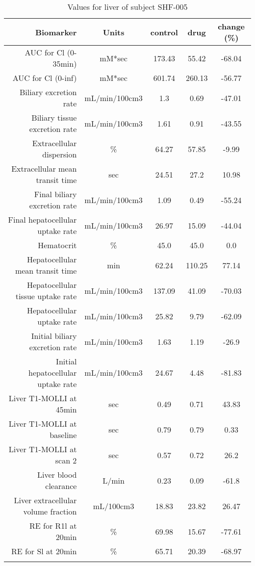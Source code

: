 \documentclass{epflreport}%
\begin{document}
%
\clearpage%
\begin{longtable}{rcccc}%
\hline%
Biomarker&Units&control&drug&change (\%)\\%
\hline%
AUC for Cl (0{-}35min)&mM*sec&173.43&55.42&{-}68.04\\%
AUC for Cl (0{-}inf)&mM*sec&601.74&260.13&{-}56.77\\%
Biliary excretion rate&mL/min/100cm3&1.3&0.69&{-}47.01\\%
Biliary tissue excretion rate&mL/min/100cm3&1.61&0.91&{-}43.55\\%
Extracellular dispersion&\%&64.27&57.85&{-}9.99\\%
Extracellular mean transit time&sec&24.51&27.2&10.98\\%
Final biliary excretion rate&mL/min/100cm3&1.09&0.49&{-}55.24\\%
Final hepatocellular uptake rate&mL/min/100cm3&26.97&15.09&{-}44.04\\%
Hematocrit&\%&45.0&45.0&0.0\\%
Hepatocellular mean transit time&min&62.24&110.25&77.14\\%
Hepatocellular tissue uptake rate&mL/min/100cm3&137.09&41.09&{-}70.03\\%
Hepatocellular uptake rate&mL/min/100cm3&25.82&9.79&{-}62.09\\%
Initial biliary excretion rate&mL/min/100cm3&1.63&1.19&{-}26.9\\%
Initial hepatocellular uptake rate&mL/min/100cm3&24.67&4.48&{-}81.83\\%
Liver T1{-}MOLLI at 45min&sec&0.49&0.71&43.83\\%
Liver T1{-}MOLLI at baseline&sec&0.79&0.79&0.33\\%
Liver T1{-}MOLLI at scan 2&sec&0.57&0.72&26.2\\%
Liver blood clearance&L/min&0.23&0.09&{-}61.8\\%
Liver extracellular volume fraction&mL/100cm3&18.83&23.82&26.47\\%
RE for R1l at 20min&\%&69.98&15.67&{-}77.61\\%
RE for Sl at 20min&\%&65.71&20.39&{-}68.97\\%
\hline%
\caption{Values for liver of subject SHF-005} \\%
\end{longtable}%
\end{document}
